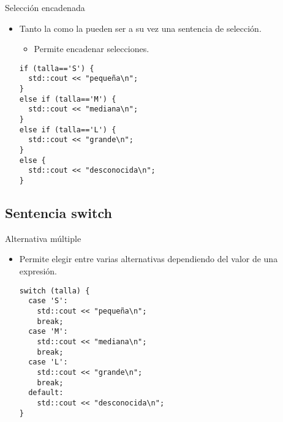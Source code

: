 \begin{frame}[t,fragile]{Selección encadenada}
\begin{itemize}
  \item Tanto la  como la  pueden
        ser a su vez una sentencia de selección.
    \begin{itemize}
      \item Permite encadenar selecciones.
    \end{itemize}
\begin{lstlisting}
if (talla=='S') {
  std::cout << "pequeña\n";
}
else if (talla=='M') {
  std::cout << "mediana\n";
}
else if (talla=='L') {
  std::cout << "grande\n";
}
else {
  std::cout << "desconocida\n";
}
\end{lstlisting}
\end{itemize}
\end{frame}

\subsection{Sentencia \textbf{switch}}

\begin{frame}[t,fragile]{Alternativa múltiple}
\begin{itemize}
  \item Permite elegir entre varias alternativas dependiendo del valor
        de una expresión.
\begin{lstlisting}
switch (talla) {
  case 'S':
    std::cout << "pequeña\n";
    break;
  case 'M':
    std::cout << "mediana\n";
    break;
  case 'L':
    std::cout << "grande\n";
    break;
  default:
    std::cout << "desconocida\n";
}
\end{lstlisting}
\end{itemize}
\end{frame}

